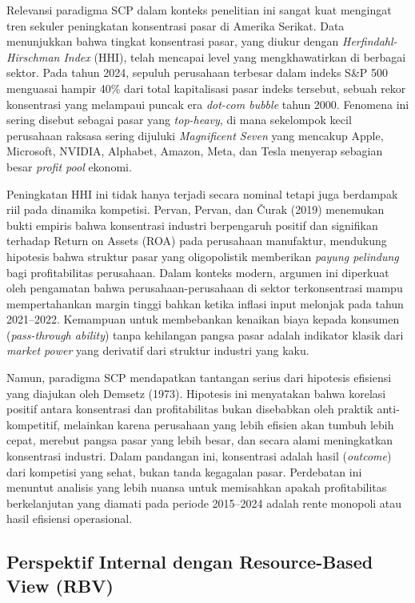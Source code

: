 \documentclass[12pt,a4paper]{report}
\begin{document}
Relevansi paradigma SCP dalam konteks penelitian ini sangat kuat mengingat tren sekuler peningkatan konsentrasi pasar di Amerika Serikat. Data menunjukkan bahwa tingkat konsentrasi pasar, yang diukur dengan \textit{Herfindahl-Hirschman Index} (HHI), telah mencapai level yang mengkhawatirkan di berbagai sektor. Pada tahun 2024, sepuluh perusahaan terbesar dalam indeks S\&P 500 menguasai hampir 40\% dari total kapitalisasi pasar indeks tersebut, sebuah rekor konsentrasi yang melampaui puncak era \textit{dot-com bubble} tahun 2000. Fenomena ini sering disebut sebagai pasar yang \textit{top-heavy}, di mana sekelompok kecil perusahaan raksasa sering dijuluki \textit{Magnificent Seven} yang mencakup Apple, Microsoft, NVIDIA, Alphabet, Amazon, Meta, dan Tesla menyerap sebagian besar \textit{profit pool} ekonomi.

Peningkatan HHI ini tidak hanya terjadi secara nominal tetapi juga berdampak riil pada dinamika kompetisi. Pervan, Pervan, dan \v{C}urak (2019) menemukan bukti empiris bahwa konsentrasi industri berpengaruh positif dan signifikan terhadap Return on Assets (ROA) pada perusahaan manufaktur, mendukung hipotesis bahwa struktur pasar yang oligopolistik memberikan \textit{payung pelindung} bagi profitabilitas perusahaan. Dalam konteks modern, argumen ini diperkuat oleh pengamatan bahwa perusahaan-perusahaan di sektor terkonsentrasi mampu mempertahankan margin tinggi bahkan ketika inflasi input melonjak pada tahun 2021--2022. Kemampuan untuk membebankan kenaikan biaya kepada konsumen (\textit{pass-through ability}) tanpa kehilangan pangsa pasar adalah indikator klasik dari \textit{market power} yang derivatif dari struktur industri yang kaku.

Namun, paradigma SCP mendapatkan tantangan serius dari hipotesis efisiensi yang diajukan oleh Demsetz (1973). Hipotesis ini menyatakan bahwa korelasi positif antara konsentrasi dan profitabilitas bukan disebabkan oleh praktik anti-kompetitif, melainkan karena perusahaan yang lebih efisien akan tumbuh lebih cepat, merebut pangsa pasar yang lebih besar, dan secara alami meningkatkan konsentrasi industri. Dalam pandangan ini, konsentrasi adalah hasil (\textit{outcome}) dari kompetisi yang sehat, bukan tanda kegagalan pasar. Perdebatan ini menuntut analisis yang lebih nuansa untuk memisahkan apakah profitabilitas berkelanjutan yang diamati pada periode 2015--2024 adalah rente monopoli atau hasil efisiensi operasional.

\subsection{Perspektif Internal dengan Resource-Based View (RBV)}
\end{document}
